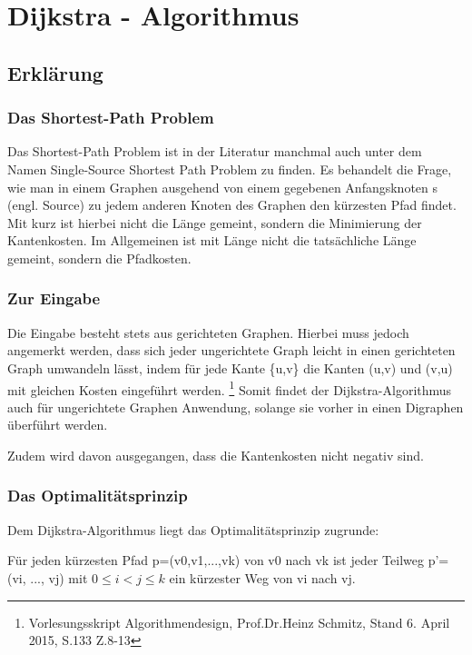 \chapter{Dijkstra - Algorithmus}

\section{Erklärung}

\subsection{Das Shortest-Path Problem}
Das Shortest-Path Problem ist in der Literatur manchmal auch unter dem Namen Single-Source Shortest Path Problem zu finden. 
Es behandelt die Frage, wie man in einem Graphen ausgehend von einem gegebenen Anfangsknoten s (engl. Source) zu jedem anderen Knoten des Graphen den kürzesten Pfad findet.
\cite[S. 572, Z. 19-20]{OttWid90}
Mit kurz ist hierbei nicht die Länge gemeint, sondern die Minimierung der Kantenkosten. Im Allgemeinen ist mit Länge nicht die tatsächliche Länge gemeint, sondern die Pfadkosten.


\subsection{Zur Eingabe}
Die Eingabe besteht stets aus gerichteten Graphen. Hierbei muss jedoch angemerkt werden, dass sich jeder ungerichtete Graph leicht in einen gerichteten Graph umwandeln lässt, indem für jede Kante \{u,v\} die Kanten (u,v) und (v,u) mit gleichen Kosten eingeführt werden.
\footnote{Vorlesungsskript Algorithmendesign, Prof.Dr.Heinz Schmitz, Stand 6. April 2015, S.133 Z.8-13}
Somit findet der Dijkstra-Algorithmus auch für ungerichtete Graphen Anwendung, solange sie vorher in einen Digraphen überführt werden. 

\parindent0pt Zudem wird davon ausgegangen, dass die Kantenkosten nicht negativ sind.

\subsection{Das Optimalitätsprinzip}
Dem Dijkstra-Algorithmus liegt das Optimalitätsprinzip zugrunde:

\parindent0pt Für jeden kürzesten Pfad p=(v{\tiny 0},v{\tiny 1},...,v{\tiny k}) von v{\tiny 0} nach v{\tiny k} ist jeder Teilweg p'=(v{\tiny i}, ..., v{\tiny j}) mit $0 \le i < j \le k$ ein kürzester Weg von v{\tiny i} nach v{\tiny j}.

